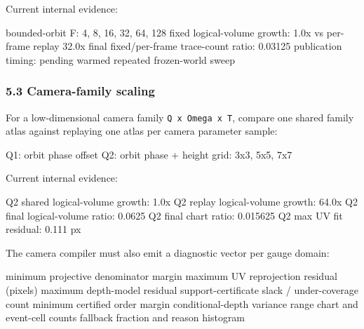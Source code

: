 \documentclass[
]{article}
\newenvironment{Shaded}{}{}
\newcommand{\NormalTok}[1]{#1}
\begin{document}
Current internal evidence:

\begin{Shaded}
\begin{Highlighting}[]
\NormalTok{bounded{-}orbit F: 4, 8, 16, 32, 64, 128}
\NormalTok{fixed logical{-}volume growth: 1.0x vs per{-}frame replay 32.0x}
\NormalTok{final fixed/per{-}frame trace{-}count ratio: 0.03125}
\NormalTok{publication timing: pending warmed repeated frozen{-}world sweep}
\end{Highlighting}
\end{Shaded}

\subsubsection{5.3 Camera-family scaling}\label{camera-family-scaling}

For a low-dimensional camera family \texttt{Q\ x\ Omega\ x\ T}, compare
one shared family atlas against replaying one atlas per camera parameter
sample:

\begin{Shaded}
\begin{Highlighting}[]
\NormalTok{Q1: orbit phase offset}
\NormalTok{Q2: orbit phase + height}
\NormalTok{grid: 3x3, 5x5, 7x7}
\end{Highlighting}
\end{Shaded}

Current internal evidence:

\begin{Shaded}
\begin{Highlighting}[]
\NormalTok{Q2 shared logical{-}volume growth: 1.0x}
\NormalTok{Q2 replay logical{-}volume growth: 64.0x}
\NormalTok{Q2 final logical{-}volume ratio: 0.0625}
\NormalTok{Q2 final chart ratio: 0.015625}
\NormalTok{Q2 max UV fit residual: 0.111 px}
\end{Highlighting}
\end{Shaded}

The camera compiler must also emit a diagnostic vector per gauge domain:

\begin{Shaded}
\begin{Highlighting}[]
\NormalTok{minimum projective denominator margin}
\NormalTok{maximum UV reprojection residual (pixels)}
\NormalTok{maximum depth{-}model residual}
\NormalTok{support{-}certificate slack / under{-}coverage count}
\NormalTok{minimum certified order margin}
\NormalTok{conditional{-}depth variance range}
\NormalTok{chart and event{-}cell counts}
\NormalTok{fallback fraction and reason histogram}
\end{Highlighting}
\end{Shaded}
\end{document}
